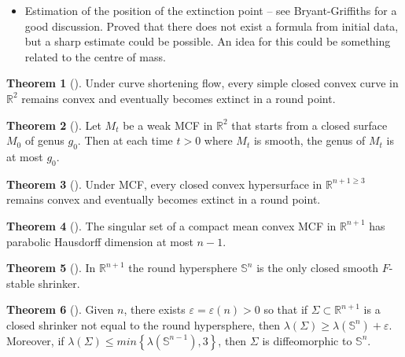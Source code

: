 \documentclass{amsart}
\theoremstyle{definition}
\newtheorem{Thm}{Theorem}[section]
\begin{document}
\begin{itemize}
\item Estimation of the position of the extinction point -- see Bryant-Griffiths for a good discussion. Proved that there does not exist a formula from initial data, but a sharp estimate could be possible. An idea for this could be something related to the centre of mass.
\end{itemize}

\begin{Thm}[\cite{Gage Hamilton 1986}]
Under curve shortening flow, every simple closed convex curve in ${\mathbb{R}}^{2}$ remains convex and eventually becomes extinct in a round point.
\end{Thm}

\begin{Thm}[\cite{White 1995}]
Let ${M}_{t}$ be a weak MCF in ${\mathbb{R}}^{2}$ that starts from a closed surface ${M}_{0}$ of genus $g_0$. Then at each time $t > 0$ where ${M}_{t}$ is smooth, the genus of  ${M}_{t}$ is at most $g_0$.
\end{Thm}

\begin{Thm}[\cite{Huisken 1984}]
Under MCF, every closed convex hypersurface in ${\mathbb{R}}^{n+1 \geq 3}$ remains convex and eventually becomes extinct in a round point.
\end{Thm}
 
\begin{Thm}[\cite{White 2000}]
The singular set of a compact mean convex MCF in ${\mathbb{R}}^{n+1}$ has parabolic Hausdorff dimension at most $n-1$.
\end{Thm}

\begin{Thm}[\cite{Colding Minicozzi 2012}]
In ${\mathbb{R}}^{n+1}$ the round hypersphere ${\mathbb{S}}^{n}$ is the only closed smooth $F$-stable shrinker.
\end{Thm}

\begin{Thm}[\cite{Colding Ilmanen Minicozzi White 2013}] \label{Colding Ilmanen Minicozzi White 2013}
Given $n$, there exists  $\varepsilon = \varepsilon(n) > 0$ so that if $\Sigma \subset {\mathbb{R}}^{n+1}$
is a closed shrinker not equal to the round hypersphere, then $\lambda\left(\Sigma\right) \geq \lambda\left({\mathbb{S}}^{n}\right) + \varepsilon$. Moreover,
if $\lambda\left(\Sigma\right) \leq min \left\{  \lambda \left({\mathbb{S}}^{n-1}\right) , 3 \right\}$, then $\Sigma$ is diffeomorphic to ${\mathbb{S}}^{n}$.
\end{Thm}
 
\end{document}
